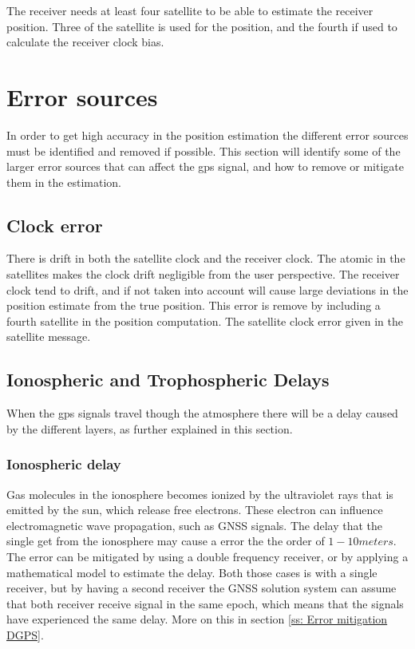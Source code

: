 The receiver needs at least four satellite to be able to estimate the receiver position. Three of the satellite is used for the position, and the fourth if used to calculate the receiver clock bias. 
 
\section{Error sources}
In order to get high accuracy in the position estimation the different error sources must be identified and removed if possible. This section will identify some of the larger error sources that can affect the \gls{gps} signal, and how to remove or mitigate them in the estimation.
\subsection{Clock error}
There is drift in both the satellite clock and the receiver clock. The atomic in the satellites makes the clock drift negligible from the user perspective. The receiver clock tend to drift, and if not taken into account will cause large deviations in the position estimate from the true position. This error is remove by including a fourth satellite in the position computation. The satellite clock error given in the satellite message. 

\subsection{Ionospheric and Trophospheric Delays}
When the \gls{gps} signals travel though the atmosphere there will be a delay caused by the different layers, as further explained in this section.
\subsubsection{Ionospheric delay}
Gas molecules in the ionosphere becomes ionized by the ultraviolet rays that is emitted by the sun, which release free electrons. These electron can influence electromagnetic wave propagation, such as GNSS signals. The delay that the single get from the ionosphere may cause a error the the order of $1-10 meters$. The error can be mitigated by using a double frequency receiver, or by applying a mathematical model to estimate the delay. Both those cases is with a single receiver, but by having a second receiver the GNSS solution system can assume that both receiver receive signal in the same epoch, which means that the signals have experienced the same delay. More on this in section \ref{ss: Error mitigation DGPS}.

